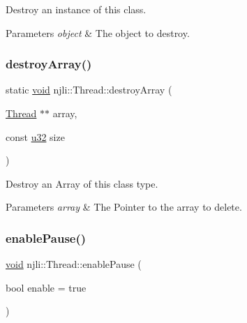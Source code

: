 Destroy an instance of this class.


\begin{DoxyParams}{Parameters}
{\em object} & The object to destroy. \\
\hline
\end{DoxyParams}
\mbox{\label{classnjli_1_1_thread_abfca36fb1618366c5c196a2c7076c245}} 
\subsubsection{\texorpdfstring{destroy\+Array()}{destroyArray()}}
{\footnotesize\ttfamily static \mbox{\hyperlink{_thread_8h_af1e856da2e658414cb2456cb6f7ebc66}{void}} njli\+::\+Thread\+::destroy\+Array (\begin{DoxyParamCaption}\item[{\mbox{\hyperlink{classnjli_1_1_thread}{Thread}} $\ast$$\ast$}]{array,  }\item[{const \mbox{\hyperlink{_util_8h_a10e94b422ef0c20dcdec20d31a1f5049}{u32}}}]{size }\end{DoxyParamCaption})\hspace{0.3cm}{\ttfamily [static]}}

Destroy an Array of this class type.


\begin{DoxyParams}{Parameters}
{\em array} & The Pointer to the array to delete. \\
\hline
\end{DoxyParams}
\mbox{\label{classnjli_1_1_thread_add29f8799756f141a64f8b559445aa72}} 
\subsubsection{\texorpdfstring{enable\+Pause()}{enablePause()}}
{\footnotesize\ttfamily \mbox{\hyperlink{_thread_8h_af1e856da2e658414cb2456cb6f7ebc66}{void}} njli\+::\+Thread\+::enable\+Pause (\begin{DoxyParamCaption}\item[{bool}]{enable = {\ttfamily true} }\end{DoxyParamCaption})}

